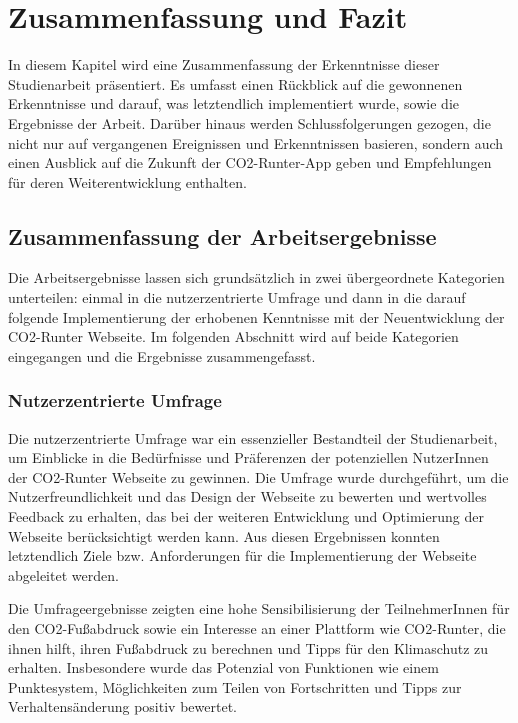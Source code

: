 
\chapter{Zusammenfassung und Fazit}
\label{chapter:7}

In diesem Kapitel wird eine Zusammenfassung der Erkenntnisse dieser Studienarbeit präsentiert. Es umfasst einen Rückblick auf die gewonnenen Erkenntnisse und darauf, was letztendlich implementiert wurde, sowie die Ergebnisse der Arbeit. Darüber hinaus werden Schlussfolgerungen gezogen, die nicht nur auf vergangenen Ereignissen und Erkenntnissen basieren, sondern auch einen Ausblick auf die Zukunft der CO2-Runter-App geben und Empfehlungen für deren Weiterentwicklung enthalten.

\section{Zusammenfassung der Arbeitsergebnisse}

Die Arbeitsergebnisse lassen sich grundsätzlich in zwei übergeordnete Kategorien unterteilen: einmal in die nutzerzentrierte Umfrage und dann in die darauf folgende Implementierung der erhobenen Kenntnisse mit der Neuentwicklung der CO2-Runter Webseite. Im folgenden Abschnitt wird auf beide Kategorien eingegangen und die Ergebnisse zusammengefasst.

\subsection{Nutzerzentrierte Umfrage}

Die nutzerzentrierte Umfrage war ein essenzieller Bestandteil der Studienarbeit, um Einblicke in die Bedürfnisse und Präferenzen der potenziellen NutzerInnen der CO2-Runter Webseite zu gewinnen. Die Umfrage wurde durchgeführt, um die Nutzerfreundlichkeit und das Design der Webseite zu bewerten und wertvolles Feedback zu erhalten, das bei der weiteren Entwicklung und Optimierung der Webseite berücksichtigt werden kann. Aus diesen Ergebnissen konnten letztendlich Ziele bzw. Anforderungen für die Implementierung der Webseite abgeleitet werden.

Die Umfrageergebnisse zeigten eine hohe Sensibilisierung der TeilnehmerInnen für den CO2-Fußabdruck sowie ein Interesse an einer Plattform wie CO2-Runter, die ihnen hilft, ihren Fußabdruck zu berechnen und Tipps für den Klimaschutz zu erhalten. Insbesondere wurde das Potenzial von Funktionen wie einem Punktesystem, Möglichkeiten zum Teilen von Fortschritten und Tipps zur Verhaltensänderung positiv bewertet.

